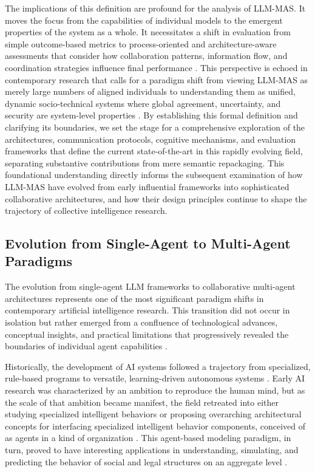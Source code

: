 \documentclass[11pt]{article}
\begin{document}
The implications of this definition are profound for the analysis of LLM-MAS. It moves the focus from the capabilities of individual models to the emergent properties of the system as a whole. It necessitates a shift in evaluation from simple outcome-based metrics to process-oriented and architecture-aware assessments that consider how collaboration patterns, information flow, and coordination strategies influence final performance \cite{ref1}. This perspective is echoed in contemporary research that calls for a paradigm shift from viewing LLM-MAS as merely large numbers of aligned individuals to understanding them as unified, dynamic socio-technical systems where global agreement, uncertainty, and security are system-level properties \cite{ref10}. By establishing this formal definition and clarifying its boundaries, we set the stage for a comprehensive exploration of the architectures, communication protocols, cognitive mechanisms, and evaluation frameworks that define the current state-of-the-art in this rapidly evolving field, separating substantive contributions from mere semantic repackaging. This foundational understanding directly informs the subsequent examination of how LLM-MAS have evolved from early influential frameworks into sophisticated collaborative architectures, and how their design principles continue to shape the trajectory of collective intelligence research.

\subsection{Evolution from Single-Agent to Multi-Agent Paradigms}

The evolution from single-agent LLM frameworks to collaborative multi-agent architectures represents one of the most significant paradigm shifts in contemporary artificial intelligence research. This transition did not occur in isolation but rather emerged from a confluence of technological advances, conceptual insights, and practical limitations that progressively revealed the boundaries of individual agent capabilities \cite{ref11}.

Historically, the development of AI systems followed a trajectory from specialized, rule-based programs to versatile, learning-driven autonomous systems \cite{ref12}. Early AI research was characterized by an ambition to reproduce the human mind, but as the scale of that ambition became manifest, the field retreated into either studying specialized intelligent behaviors or proposing overarching architectural concepts for interfacing specialized intelligent behavior components, conceived of as agents in a kind of organization \cite{ref13}. This agent-based modeling paradigm, in turn, proved to have interesting applications in understanding, simulating, and predicting the behavior of social and legal structures on an aggregate level \cite{ref13}.
\end{document}
